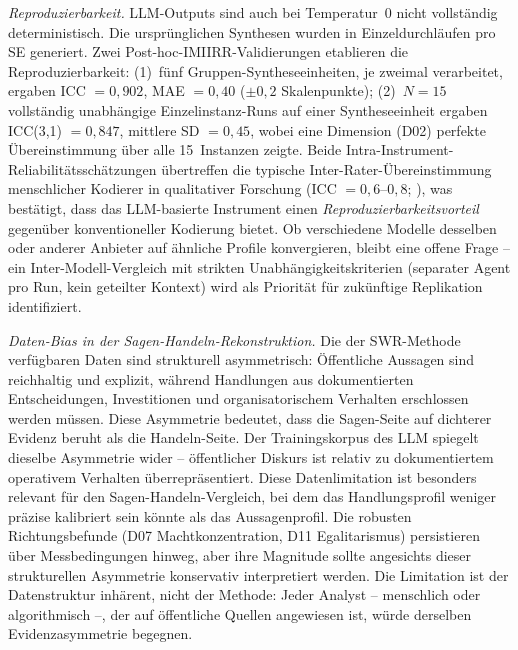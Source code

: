 \documentclass[12pt,a4paper]{article}
\begin{document}
\emph{Reproduzierbarkeit.} LLM-Outputs sind auch bei Temperatur~0 nicht vollständig deterministisch. Die ursprünglichen Synthesen wurden in Einzeldurchläufen pro SE generiert. Zwei Post-hoc-IMIIRR-Validierungen etablieren die Reproduzierbarkeit: (1)~fünf Gruppen-Syntheseeinheiten, je zweimal verarbeitet, ergaben ICC $= 0{,}902$, MAE $= 0{,}40$ ($\pm 0{,}2$ Skalenpunkte); (2)~$N = 15$ vollständig unabhängige Einzelinstanz-Runs auf einer Syntheseeinheit ergaben ICC(3,1) $= 0{,}847$, mittlere SD $= 0{,}45$, wobei eine Dimension (D02) perfekte Übereinstimmung über alle 15~Instanzen zeigte. Beide Intra-Instrument-Reliabilitätsschätzungen übertreffen die typische Inter-Rater-Übereinstimmung menschlicher Kodierer in qualitativer Forschung (ICC $= 0{,}6$--$0{,}8$; \citealt{Hallgren2012}), was bestätigt, dass das LLM-basierte Instrument einen \emph{Reproduzierbarkeits\-vorteil} gegenüber konventioneller Kodierung bietet. Ob verschiedene Modelle desselben oder anderer Anbieter auf ähnliche Profile konvergieren, bleibt eine offene Frage -- ein Inter-Modell-Vergleich mit strikten Unabhängigkeitskriterien (separater Agent pro Run, kein geteilter Kontext) wird als Priorität für zukünftige Replikation identifiziert.

\emph{Daten-Bias in der Sagen-Handeln-Rekonstruktion.} Die der SWR-Methode verfügbaren Daten sind strukturell asymmetrisch: Öffentliche Aussagen sind reichhaltig und explizit, während Handlungen aus dokumentierten Entscheidungen, Investitionen und organisatorischem Verhalten erschlossen werden müssen. Diese Asymmetrie bedeutet, dass die \glqq Sagen\grqq-Seite auf dichterer Evidenz beruht als die \glqq Handeln\grqq-Seite. Der Trainingskorpus des LLM spiegelt dieselbe Asymmetrie wider -- öffentlicher Diskurs ist relativ zu dokumentiertem operativem Verhalten überrepräsentiert. Diese Datenlimitation ist besonders relevant für den Sagen-Handeln-Vergleich, bei dem das Handlungsprofil weniger präzise kalibriert sein könnte als das Aussagenprofil. Die robusten Richtungsbefunde (D07 Machtkonzentration, D11 Egalitarismus) persistieren über Messbedingungen hinweg, aber ihre Magnitude sollte angesichts dieser strukturellen Asymmetrie konservativ interpretiert werden. Die Limitation ist der Datenstruktur inhärent, nicht der Methode: Jeder Analyst -- menschlich oder algorithmisch --, der auf öffentliche Quellen angewiesen ist, würde derselben Evidenzasymmetrie begegnen.
\end{document}
